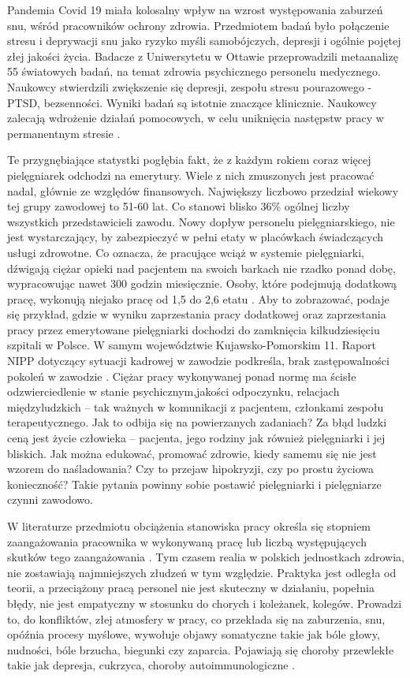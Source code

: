 \documentclass[a4paper,12pt,twoside,openany]{report}
\begin{document}
Pandemia Covid 19 miała kolosalny wpływ na wzrost występowania zaburzeń snu, wśród pracowników ochrony zdrowia. Przedmiotem badań było połączenie stresu i deprywacji snu jako ryzyko myśli samobójczych, depresji i ogólnie pojętej złej jakości życia.  Badacze z Uniwersytetu w Ottawie przeprowadzili metaanalizę 55 światowych badań, na temat zdrowia psychicznego personelu medycznego. Naukowcy stwierdzili zwiększenie się depresji, zespołu stresu pourazowego - PTSD, bezsenności. Wyniki badań są istotnie znaczące klinicznie. Naukowcy zalecają  wdrożenie działań  pomocowych, w celu uniknięcia  następstw pracy w permanentnym stresie  \cite{sen}.

Te przygnębiające statystki pogłębia fakt, że z każdym rokiem coraz więcej pielęgniarek odchodzi na emerytury. Wiele z nich zmuszonych jest pracować nadal, głównie ze względów finansowych.  Największy liczbowo przedział wiekowy tej grupy zawodowej to 51-60 lat. Co stanowi blisko 36\% ogólnej liczby wszystkich przedstawicieli zawodu. Nowy dopływ personelu pielęgniarskiego, nie jest wystarczający, by zabezpieczyć w pełni etaty w placówkach świadczących usługi zdrowotne. Co oznacza, że pracujące wciąż w systemie pielęgniarki, dźwigają ciężar opieki nad pacjentem na swoich barkach nie rzadko ponad dobę, wypracowując nawet 300 godzin miesięcznie. Osoby, które podejmują dodatkową pracę, wykonują niejako pracę od 1,5 do 2,6 etatu \cite{cyfrowe}. Aby to zobrazować, podaje się przykład, gdzie w wyniku zaprzestania pracy dodatkowej oraz zaprzestania pracy przez emerytowane pielęgniarki dochodzi do zamknięcia kilkudziesięciu szpitali w Polsce. W samym województwie Kujawsko-Pomorskim 11. Raport NIPP dotyczący sytuacji kadrowej w zawodzie podkreśla, brak zastępowalności pokoleń w zawodzie \cite{statystyka}. Ciężar pracy wykonywanej ponad normę ma ścisłe odzwierciedlenie w  stanie psychicznym,jakości  odpoczynku, relacjach międzyludzkich – tak ważnych w komunikacji z pacjentem, członkami zespołu terapeutycznego. Jak to odbija się na powierzanych zadaniach? Za błąd ludzki ceną jest życie człowieka – pacjenta, jego rodziny jak również pielęgniarki i jej bliskich. Jak można edukować, promować zdrowie, kiedy samemu się nie jest wzorem do naśladowania? Czy to przejaw hipokryzji, czy po prostu życiowa konieczność? Takie pytania powinny sobie postawić pielęgniarki i pielęgniarze czynni zawodowo.

W literaturze przedmiotu obciążenia stanowiska pracy określa się stopniem zaangażowania pracownika w wykonywaną pracę lub liczbą występujących skutków tego zaangażowania \cite{stanowisko}. Tym czasem realia w polskich jednostkach zdrowia, nie zostawiają najmniejszych złudzeń w tym względzie. Praktyka jest odległa od teorii, a przeciążony pracą personel nie jest skuteczny w działaniu, popełnia błędy, nie jest empatyczny w stosunku do chorych i koleżanek, kolegów. Prowadzi to, do konfliktów, złej atmosfery w pracy, co przekłada się na zaburzenia, snu, opóźnia procesy myślowe, wywołuje objawy somatyczne takie jak bóle głowy, nudności, bóle brzucha, biegunki czy zaparcia. Pojawiają się choroby przewlekłe takie jak depresja, cukrzyca, choroby autoimmunologiczne \cite{zdrowie}.
\end{document}
